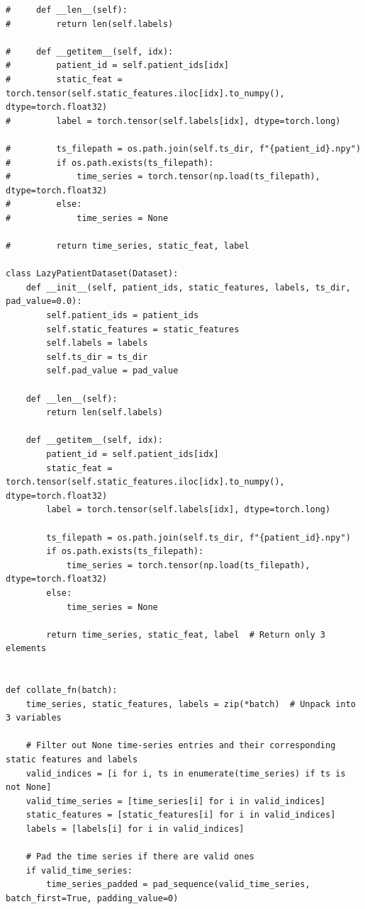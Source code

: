 \begin{appendices}
\begin{mdframed}
\begin{lstlisting}[breaklines=true]
#     def __len__(self):
#         return len(self.labels)

#     def __getitem__(self, idx):
#         patient_id = self.patient_ids[idx]
#         static_feat = torch.tensor(self.static_features.iloc[idx].to_numpy(), dtype=torch.float32)
#         label = torch.tensor(self.labels[idx], dtype=torch.long)

#         ts_filepath = os.path.join(self.ts_dir, f"{patient_id}.npy")
#         if os.path.exists(ts_filepath):
#             time_series = torch.tensor(np.load(ts_filepath), dtype=torch.float32)
#         else:
#             time_series = None

#         return time_series, static_feat, label

class LazyPatientDataset(Dataset):
    def __init__(self, patient_ids, static_features, labels, ts_dir, pad_value=0.0):
        self.patient_ids = patient_ids
        self.static_features = static_features
        self.labels = labels
        self.ts_dir = ts_dir
        self.pad_value = pad_value

    def __len__(self):
        return len(self.labels)

    def __getitem__(self, idx):
        patient_id = self.patient_ids[idx]
        static_feat = torch.tensor(self.static_features.iloc[idx].to_numpy(), dtype=torch.float32)
        label = torch.tensor(self.labels[idx], dtype=torch.long)

        ts_filepath = os.path.join(self.ts_dir, f"{patient_id}.npy")
        if os.path.exists(ts_filepath):
            time_series = torch.tensor(np.load(ts_filepath), dtype=torch.float32)
        else:
            time_series = None

        return time_series, static_feat, label  # Return only 3 elements

    
def collate_fn(batch):
    time_series, static_features, labels = zip(*batch)  # Unpack into 3 variables

    # Filter out None time-series entries and their corresponding static features and labels
    valid_indices = [i for i, ts in enumerate(time_series) if ts is not None]
    valid_time_series = [time_series[i] for i in valid_indices]
    static_features = [static_features[i] for i in valid_indices]
    labels = [labels[i] for i in valid_indices]

    # Pad the time series if there are valid ones
    if valid_time_series:
        time_series_padded = pad_sequence(valid_time_series, batch_first=True, padding_value=0)
        

\end{lstlisting}
\end{mdframed}
\end{appendices}
